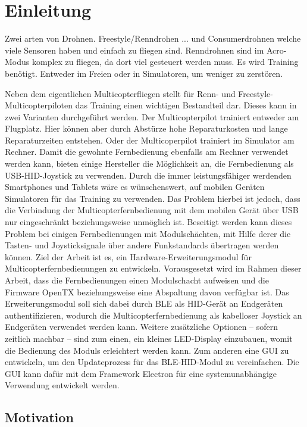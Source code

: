 
\chapter{Einleitung}

Zwei arten von Drohnen. Freestyle/Renndrohen ... und Consumerdrohnen welche viele Sensoren haben und einfach zu fliegen sind.
Renndrohnen sind im Acro-Modus komplex zu fliegen, da dort viel gesteuert werden muss.
Es wird Training benötigt. Entweder im Freien oder in Simulatoren, um weniger zu zerstören.

Neben dem eigentlichen Multicopterfliegen stellt für Renn- und Freestyle-Multicopterpiloten das Training einen wichtigen Bestandteil dar. Dieses kann in zwei Varianten durchgeführt werden. Der
Multicopterpilot trainiert entweder am Flugplatz. Hier können aber durch Abstürze hohe Reparaturkosten und lange Reparaturzeiten entstehen. Oder der Multicoperpilot trainiert im Simulator am Rechner.
Damit die gewohnte Fernbedienung ebenfalls am Rechner verwendet werden kann, bieten einige Hersteller die Möglichkeit an, die Fernbedienung als USB-HID-Joystick zu verwenden.
Durch die immer leistungsfähiger werdenden Smartphones und Tablets wäre es wünschenswert, auf mobilen Geräten Simulatoren für das Training zu verwenden. Das Problem hierbei ist jedoch, dass die
Verbindung der Multicopterfernbedienung mit dem mobilen Gerät über USB nur eingeschränkt beziehungsweise unmöglich ist. Beseitigt werden kann dieses Problem bei einigen Fernbedienungen mit
Modulschächten, mit Hilfe derer die Tasten- und Joysticksignale über andere Funkstandards übertragen werden können.
Ziel der Arbeit ist es, ein Hardware-Erweiterungsmodul für Multicopterfernbedienungen zu entwickeln. Vorausgesetzt wird im Rahmen dieser Arbeit, dass die Fernbedienungen einen Modulschacht aufweisen
und die Firmware OpenTX beziehungsweise eine Abspaltung davon verfügbar ist. Das Erweiterungsmodul soll sich dabei durch BLE als HID-Gerät an Endgeräten authentifizieren, wodurch die
Multicopterfernbedienung als kabelloser Joystick an Endgeräten verwendet werden kann.
Weitere zusätzliche Optionen -- sofern zeitlich machbar -- sind zum einen, ein kleines LED-Display einzubauen, womit die Bedienung des Moduls erleichtert werden kann. Zum anderen eine GUI zu entwickeln,
um den Updateprozess für das BLE-HID-Modul zu vereinfachen. Die GUI kann dafür mit dem Framework Electron für eine systemunabhängige Verwendung entwickelt werden.

\section{Motivation}

